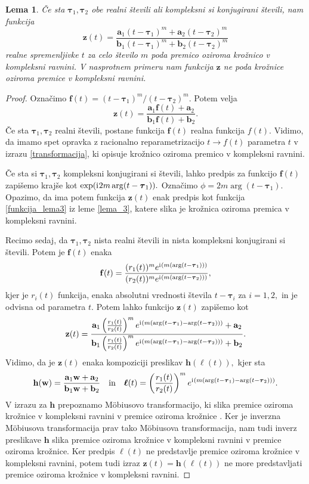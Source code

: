 \documentclass[12pt,a4paper,twoside]{article}
\newcommand{\iu}{\mathrm{i}\mkern1mu} %
\theoremstyle{definition} %
\theoremstyle{plain} %
\newtheorem{lema}[definicija]{Lema}
\theoremstyle{primerstyle}
\numberwithin{equation}{section}  %
\newcommand{\aV}{\mathbf{a}}
\newcommand{\bV}{\mathbf{b}}
\newcommand{\fV}{\mathbf{f}}
\newcommand{\hV}{\mathbf{h}}
\newcommand{\wV}{\mathbf{w}}
\newcommand{\zV}{\mathbf{z}}
\newcommand{\btau}{\boldsymbol \tau}
\newcommand{\bell}{\boldsymbol \ell}
\begin{document}
\begin{lema}
	\label{lema_4}
	Če sta $\btau_1,\btau_2$ obe realni števili ali kompleksni si konjugirani števili, nam funkcija
	\begin{equation}
		\label{funkcija_lema4}
		\zV(t)=\frac{\aV_1(t-\btau_1)^m+\aV_2(t-\btau_2)^m}{\bV_1(t-\btau_1)^m+\bV_2(t-\btau_2)^m}
	\end{equation}
	realne spremenljivke $t$ za celo število $m$ poda premico oziroma krožnico v kompleksni ravnini. V nasprotnem primeru nam funkcija $\zV$ ne poda krožnice oziroma premice v kompleksni ravnini.
\end{lema}
\begin{proof}
	Označimo $\fV(t)=(t-\btau_1)^m/(t-\btau_2)^m.$ Potem velja
	\begin{equation*}
		\zV(t)=\frac{\aV_1\fV(t)+\aV_2}{\bV_1\fV(t)+\bV_2}.
	\end{equation*}
	Če sta $\btau_1,\btau_2$ realni števili, postane funkcija $\fV(t)$ realna funkcija $f(t).$ Vidimo, da imamo spet opravka z racionalno reparametrizacijo $t\to f(t)$ parametra $t$ v izrazu \eqref{transformacija}, ki opisuje krožnico oziroma premico v kompleksni ravnini.
	
	Če sta si $\btau_1,\btau_2$ kompleksni konjugirani si števili, lahko predpis za funkcijo $\fV(t)$ zapišemo krajše kot $\exp(\iu2m\arg(t-\btau_1)).$ Označimo $\phi=2m\arg(t-\btau_1).$ Opazimo, da ima potem funkcija $\zV(t)$ enak predpis kot funkcija \eqref{funkcija_lema3} iz leme \ref{lema_3}, katere slika je krožnica oziroma premica v kompleksni ravnini.
	
	Recimo sedaj, da $\btau_1,\btau_2$ nista realni števili in nista kompleksni konjugirani si števili. Potem je $\fV(t)$ enaka
	\begin{equation*}
		\fV(t)=\frac{(r_1(t))^me^{\iu(m(\arg(t-\btau_1)))}}{(r_2(t))^me^{\iu(m(\arg(t-\btau_2)))}},
	\end{equation*}
	kjer je $r_i(t)$ funkcija, enaka absolutni vrednosti števila $t-\btau_i$ za $i=1,2,$ in je odvisna od parametra $t.$ Potem lahko funkcijo $\zV(t)$ zapišemo kot
	\begin{equation*}
		\zV(t)=\frac{\aV_1\left(\frac{r_1(t)}{r_2(t)}\right)^me^{\iu(m(\arg(t-\btau_1)-\arg(t-\btau_2)))}+\aV_2}{\bV_1\left(\frac{r_1(t)}{r_2(t)}\right)^me^{\iu(m(\arg(t-\btau_1)-\arg(t-\btau_2)))}+\bV_2}.
	\end{equation*}
	Vidimo, da je $\zV(t)$ enaka kompoziciji preslikav $\hV(\bell(t)),$ kjer sta $$\hV(\wV)=\frac{\aV_1\wV+\aV_2}{\bV_1\wV+\bV_2}\quad\text{in}\quad\bell(t)=\left(\frac{r_1(t)}{r_2(t)}\right)^me^{\iu(m(\arg(t-\btau_1)-\arg(t-\btau_2)))}.$$ V izrazu za $\hV$ prepoznamo Möbiusovo transformacijo, ki slika premice oziroma krožnice v kompleksni ravnini v premice oziroma krožnice \cite{needham1998visual}. Ker je inverzna Möbiusova transformacija prav tako Möbiusova transformacija, nam tudi inverz preslikave $\hV$ slika premice oziroma krožnice v kompleksni ravnini v premice oziroma krožnice. Ker predpis $\bell(t)$ ne predstavlje premice oziroma krožnice v kompleksni ravnini, potem tudi izraz $\zV(t)=\hV(\bell(t))$ ne more predstavljati premice oziroma krožnice v kompleksni ravnini. 
\end{proof}
\end{document}
